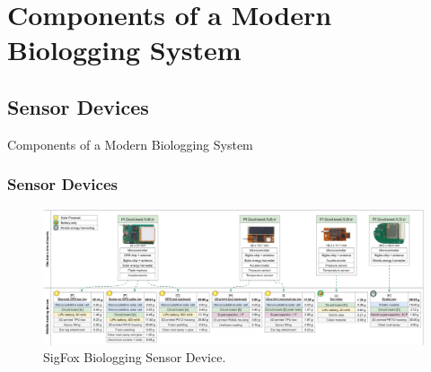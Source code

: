 \documentclass{beamer}
\begin{document}
\section{Components of a Modern Biologging System}

\subsection{Sensor Devices}

  \begin{frame}{Components of a Modern Biologging System}
    \frametitle{Sensor Devices}
    \begin{figure}[htbp]
      \centering
      \includegraphics[width=\textwidth]{SigFox_Sensor_device.png}
      \caption{SigFox Biologging Sensor Device.\cite{wild2023multi}}
      \label{fig:SigFox_Biologging_device}
    \end{figure}
  \end{frame}
\end{document}
